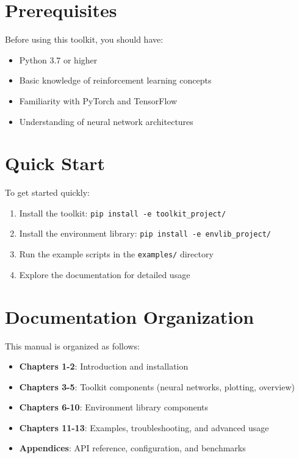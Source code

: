 \section{Prerequisites}

Before using this toolkit, you should have:

\begin{itemize}
    \item Python 3.7 or higher
    \item Basic knowledge of reinforcement learning concepts
    \item Familiarity with PyTorch and TensorFlow
    \item Understanding of neural network architectures
\end{itemize}

\section{Quick Start}

To get started quickly:

\begin{enumerate}
    \item Install the toolkit: \texttt{pip install -e toolkit\_project/}
    \item Install the environment library: \texttt{pip install -e envlib\_project/}
    \item Run the example scripts in the \texttt{examples/} directory
    \item Explore the documentation for detailed usage
\end{enumerate}

\section{Documentation Organization}

This manual is organized as follows:

\begin{itemize}
    \item \textbf{Chapters 1-2}: Introduction and installation
    \item \textbf{Chapters 3-5}: Toolkit components (neural networks, plotting, overview)
    \item \textbf{Chapters 6-10}: Environment library components
    \item \textbf{Chapters 11-13}: Examples, troubleshooting, and advanced usage
    \item \textbf{Appendices}: API reference, configuration, and benchmarks
\end{itemize}

